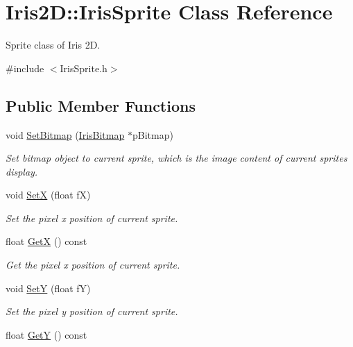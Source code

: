 \hypertarget{class_iris2_d_1_1_iris_sprite}{}\section{Iris2D\+:\+:Iris\+Sprite Class Reference}
\label{class_iris2_d_1_1_iris_sprite}


Sprite class of Iris 2D.  




{\ttfamily \#include $<$Iris\+Sprite.\+h$>$}

\subsection*{Public Member Functions}
\begin{DoxyCompactItemize}
\item 
void \hyperlink{class_iris2_d_1_1_iris_sprite_a17609cfcb89b4ea714389c40f143c7af}{Set\+Bitmap} (\hyperlink{class_iris2_d_1_1_iris_bitmap}{Iris\+Bitmap} $\ast$p\+Bitmap)
\begin{DoxyCompactList}\small\item\em Set bitmap object to current sprite, which is the image content of current sprite\textquotesingle{}s display. \end{DoxyCompactList}\item 
void \hyperlink{class_iris2_d_1_1_iris_sprite_adfabb55dba020af9fe324d4abfa7f07a}{SetX} (float fX)
\begin{DoxyCompactList}\small\item\em Set the pixel x position of current sprite. \end{DoxyCompactList}\item 
float \hyperlink{class_iris2_d_1_1_iris_sprite_a6de92be964427290ad6daa0ee294cf21}{GetX} () const
\begin{DoxyCompactList}\small\item\em Get the pixel x position of current sprite. \end{DoxyCompactList}\item 
void \hyperlink{class_iris2_d_1_1_iris_sprite_a8064039bfeb3a364a8abeae7265cd429}{SetY} (float fY)
\begin{DoxyCompactList}\small\item\em Set the pixel y position of current sprite. \end{DoxyCompactList}\item 
float \hyperlink{class_iris2_d_1_1_iris_sprite_afe8423cb0d34987c87f020ba3ba34b67}{GetY} () const

\end{DoxyCompactItemize}
